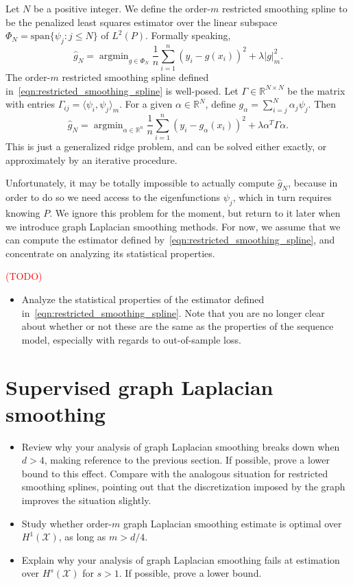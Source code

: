 \documentclass{article}
\newcommand{\Reals}{\mathbb{R}}
\newcommand{\1}{\mathbf{1}}
\DeclareMathOperator*{\argmin}{argmin}
\newcommand{\mc}[1]{\mathcal{#1}}
\newcommand{\dotp}[2]{\langle #1, #2 \rangle}
\newcommand{\wh}[1]{\widehat{#1}}
\theoremstyle{alden}
\theoremstyle{aldenthm}
\theoremstyle{definition}
\theoremstyle{remark}
\begin{document}
Let $N$ be a positive integer. We define the order-$m$ restricted smoothing spline to be the penalized least squares estimator over the linear subspace  $\Phi_N = \mathrm{span}\{\psi_j: j \leq N\}$ of $L^2(P)$. Formally speaking,
\begin{equation}
\label{eqn:restricted_smoothing_spline}
\wh{g}_{N} = \argmin_{g \in \Phi_N} \frac{1}{n} \sum_{i = 1}^{n} (y_i - g(x_i))^2 + \lambda |g|_{m}^2.
\end{equation}
The order-$m$ restricted smoothing spline defined in~\eqref{eqn:restricted_smoothing_spline} is well-posed. Let $\Gamma \in \Reals^{N \times N}$ be the matrix with entries $\Gamma_{ij} = \dotp{\psi_i}{\psi_j}_{m}$. For a given $\alpha \in \Reals^N$, define $g_{\alpha} = \sum_{i = j}^{N} \alpha_j \psi_j$. Then
\begin{equation*}
\wh{g}_{N} = \argmin_{\alpha \in \Reals^n} \frac{1}{n} \sum_{i = 1}^{n} (y_i - g_{\alpha}(x_i))^2 + \lambda \alpha^T \Gamma \alpha.
\end{equation*}
This is just a generalized ridge problem, and can be solved either exactly, or approximately by an iterative procedure.

Unfortunately, it may be totally impossible to actually compute $\wh{g}_N$, because in order to do so we need access to the eigenfunctions $\psi_j$, which in turn requires knowing $P$. We ignore this problem for the moment, but return to it later when we introduce graph Laplacian smoothing methods. For now, we assume that we can compute the estimator defined by~\eqref{eqn:restricted_smoothing_spline}, and concentrate on analyzing its statistical properties. 

\textcolor{red}{(TODO)}
\begin{itemize}
	\item Analyze the statistical properties of the estimator defined in~\eqref{eqn:restricted_smoothing_spline}. Note that you are no longer clear about whether or not these are the same as the properties of the sequence model, especially with regards to out-of-sample loss.
\end{itemize}

\section{Supervised graph Laplacian smoothing}

\begin{itemize}
	\item Review why your analysis of graph Laplacian smoothing breaks down when $d > 4$, making reference to the previous section. If possible, prove a lower bound to this effect. Compare with the analogous situation for restricted smoothing splines, pointing out that the discretization imposed by the graph improves the situation slightly.
	\item Study whether order-$m$ graph Laplacian smoothing estimate is optimal over $H^1(\mc{X})$, as long as $m > d/4$. 
	\item Explain why your analysis of graph Laplacian smoothing fails at estimation over $H^s(\mc{X})$ for $s > 1$. If possible, prove a lower bound.
\end{itemize}
\end{document}
